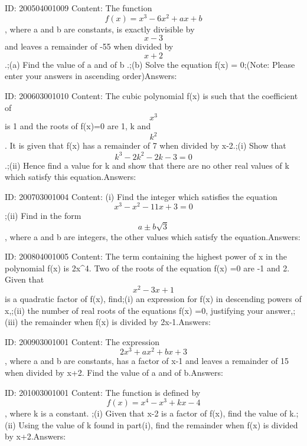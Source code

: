 \documentclass{article}
\begin{document}
ID: 200504001009
Content:
The function $$f(x)=x^3-6x^2+ax+b$$, where a and b are constants, is exactly divisible by $$x-3$$ and leaves a remainder of -55 when divided by $$x + 2$$.;(a)	Find the value of a and of b .;(b)	Solve the equation f(x) = 0;(Note: Please enter your answers in ascending order)Answers:

ID: 200603001010
Content:
The cubic polynomial f(x) is such that the coefficient of $$x^3$$ is 1 and the roots of f(x)=0 are 1, k and $$k^2$$. It is given that f(x) has a remainder of 7 when divided by x-2.;(i)	Show that $$k^3-2k^2-2k-3=0$$.;(ii)	Hence find a value for k and show that there are no other real values of k which satisfy this equation.Answers:

ID: 200703001004
Content:
(i) Find the integer which satisfies the equation $$x^3-x^2-11x+3=0$$ ;(ii)	Find in the form $$a\pm b\sqrt3$$, where a and b are integers, the other values which satisfy the equation.Answers:

ID: 200804001005
Content:
The term containing the highest power of x in the polynomial f(x) is 2x^4. Two of the roots of the equation f(x) =0  are -1 and 2. Given that $$x^2-3x+1$$ is a quadratic factor of f(x), find;(i) an expression for f(x) in descending powers of x,;(ii) the number of real roots of the equations f(x) =0, justifying your answer,;(iii) the remainder when f(x) is divided by 2x-1.Answers:

ID: 200903001001
Content:
The expression $$2x^3 + ax^2 + bx +3$$, where a and b are constants, has a factor of x-1 and leaves a remainder of 15 when divided by x+2. Find the value of a and of b.Answers:

ID: 201003001001
Content:
The function is defined by $$f(x) = x^4 -x^3+kx-4$$, where k is a constant. ;(i) Given that x-2 is a factor of f(x), find the value of k.;(ii) Using the value of k found in part(i), find the remainder when f(x) is divided by x+2.Answers:
\end{document}
